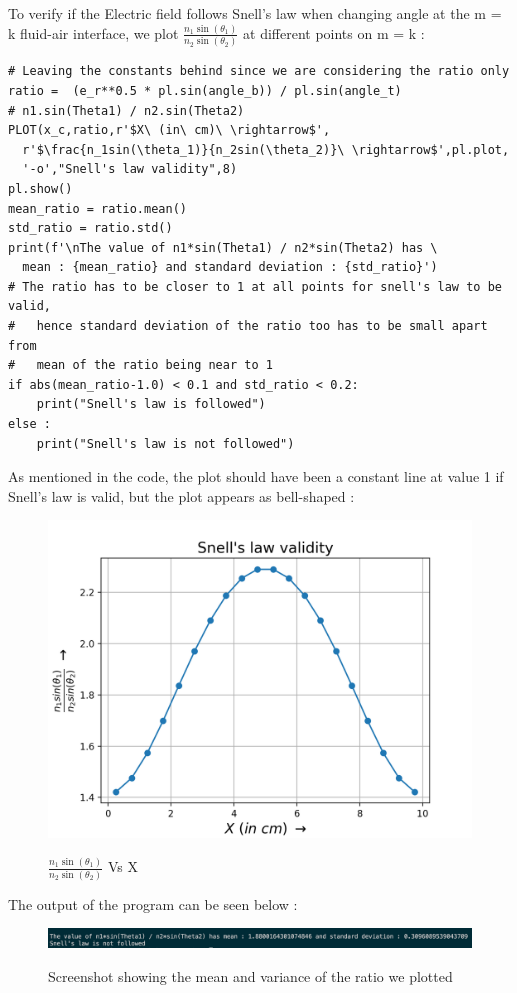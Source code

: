 \documentclass[11pt, a4paper]{article}
\begin{document}
To verify if the Electric field follows Snell's law when changing angle at the m = k fluid-air interface,
we plot $\frac{n_1\sin(\theta_1)}{n_2\sin(\theta_2)}$ at different points on m = k :
\begin{verbatim}
# Leaving the constants behind since we are considering the ratio only
ratio =  (e_r**0.5 * pl.sin(angle_b)) / pl.sin(angle_t)  
# n1.sin(Theta1) / n2.sin(Theta2)
PLOT(x_c,ratio,r'$X\ (in\ cm)\ \rightarrow$',
  r'$\frac{n_1sin(\theta_1)}{n_2sin(\theta_2)}\ \rightarrow$',pl.plot,
  '-o',"Snell's law validity",8)
pl.show()
mean_ratio = ratio.mean()
std_ratio = ratio.std()
print(f'\nThe value of n1*sin(Theta1) / n2*sin(Theta2) has \
  mean : {mean_ratio} and standard deviation : {std_ratio}')
# The ratio has to be closer to 1 at all points for snell's law to be valid,
#   hence standard deviation of the ratio too has to be small apart from 
#   mean of the ratio being near to 1
if abs(mean_ratio-1.0) < 0.1 and std_ratio < 0.2:
    print("Snell's law is followed")
else :
    print("Snell's law is not followed")
\end{verbatim}
As mentioned in the code, the plot should have been a constant line at value 1 if 
Snell's law is valid, but the plot appears as bell-shaped :
\begin{figure}[H]
  \centering
  \includegraphics[scale=0.6]{snell.png}
  \label{fig:snell}
  \caption{$\frac{n_1\sin(\theta_1)}{n_2\sin(\theta_2)}$ Vs X}
\end{figure}
The output of the program can be seen below :
\begin{figure}[H]
  \centering
  \includegraphics[scale=0.45]{snell_out.png}
  \label{fig:snell_out}
  \caption{Screenshot showing the mean and variance of the ratio we plotted}
\end{figure}
\end{document}
